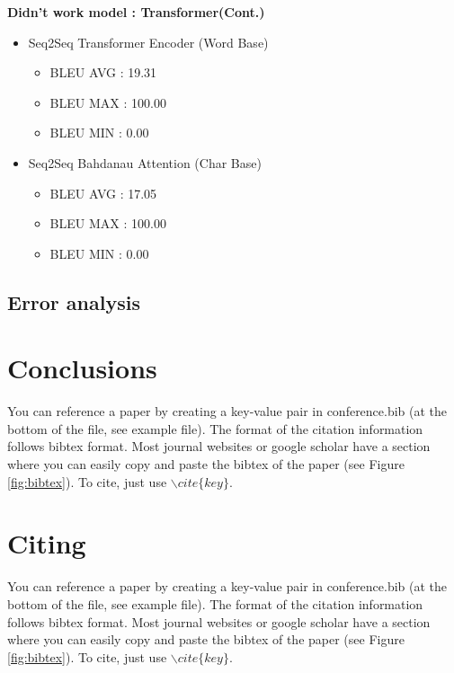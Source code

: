 \documentclass{article}
\begin{document}
{\bf Didn’t work model : Transformer(Cont.)}


\begin{itemize}
\item Seq2Seq Transformer Encoder (Word Base)
\begin{itemize}
\item BLEU AVG : 19.31
\item BLEU MAX : 100.00
\item BLEU MIN : 0.00
\end{itemize}
\end{itemize}

\begin{itemize}
\item Seq2Seq Bahdanau Attention (Char Base)
\begin{itemize}
\item BLEU AVG : 17.05
\item BLEU MAX : 100.00
\item BLEU MIN : 0.00
\end{itemize}
\end{itemize}

\subsection{Error analysis}


\section{Conclusions} \label{sec:conclusion}

You can reference a paper by creating a key-value pair in conference.bib (at the bottom of the file, see example file). The format of the citation information follows bibtex format. Most journal websites or google scholar have a section where you can easily copy and paste the bibtex of the paper (see Figure \ref{fig:bibtex}). To cite, just use $\backslash cite\{key\}$. 

\section{Citing} \label{sec:cite}

You can reference a paper by creating a key-value pair in conference.bib (at the bottom of the file, see example file). The format of the citation information follows bibtex format. Most journal websites or google scholar have a section where you can easily copy and paste the bibtex of the paper (see Figure \ref{fig:bibtex}). To cite, just use $\backslash cite\{key\}$. 
\end{document}
